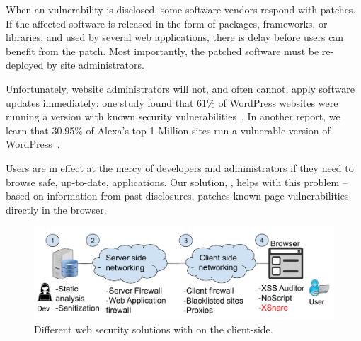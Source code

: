 When an \xss vulnerability is disclosed, some software vendors respond
with patches. If the affected software is released in the form of
packages, frameworks, or libraries, and used by several web
applications, there is delay before users can benefit from the
patch. Most importantly, the patched software must be re-deployed by
site administrators.

Unfortunately, website administrators will not, and often cannot,
apply software updates immediately: one study found
that 61\% of WordPress websites were running a version with known
security vulnerabilities~\cite{Sucuri}. In another report, we learn
that 30.95\% of Alexa's top 1 Million sites run a vulnerable version
of WordPress~\cite{wpwhitesecurity}.

Users are in effect at the mercy of developers and administrators if
they need to browse safe, up-to-date, applications. Our solution, \textbf{\sys},
helps with this problem -- based on information from past disclosures,
\sys patches known page vulnerabilities directly in the browser.

\begin{figure}[h]
  \includegraphics[scale=0.37]{img/web_app_architecture.pdf}
  \vspace*{-5.0ex}
  \caption{Different web security solutions with \sys on the client-side.}
  \label{fig:web_architecture}
\end{figure}

